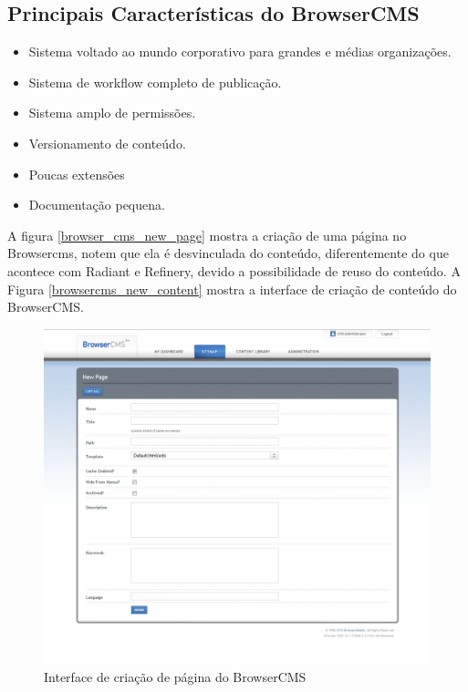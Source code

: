 \subsection{Principais Características do BrowserCMS}

\begin{itemize}
  \item Sistema voltado ao mundo corporativo para grandes e médias organizações.
  \item Sistema de workflow completo de publicação.
  \item Sistema amplo de permissões.
  \item Versionamento de conteúdo.
  \item Poucas extensões 
  \item Documentação pequena.
\end{itemize}

A figura \ref{browser_cms_new_page} mostra a criação de uma página no Browsercms, notem que ela é desvinculada do conteúdo, diferentemente do que acontece com Radiant e Refinery, devido a possibilidade de reuso do conteúdo. A Figura \ref{browsercms_new_content} mostra a interface de criação de conteúdo do BrowserCMS.

\begin{figure}[here]
\includegraphics[width=150mm]{images/browser_cms_new_page.jpg}
\caption{Interface de criação de página do BrowserCMS}
\label{fig:browsercms_new_page}
\end{figure}

